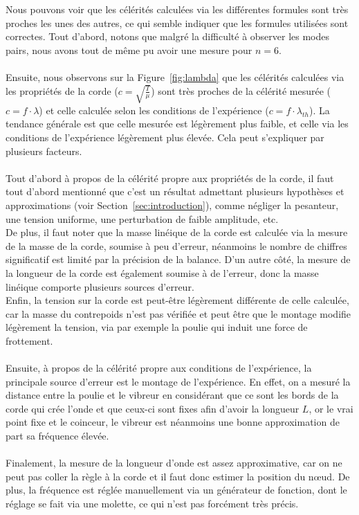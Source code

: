 \documentclass[11pt]{article}
\begin{document}
    Nous pouvons voir que les célérités calculées via les différentes formules sont très proches les unes des autres,
    ce qui semble indiquer que les formules utilisées sont correctes.
    Tout d'abord, notons que malgré la difficulté à observer les modes pairs, nous avons tout de même pu avoir une
    mesure pour $n=6$.\\ \\
    Ensuite, nous observons sur la Figure~\ref{fig:lambda} que les célérités calculées via les propriétés de la corde
    ($c = \sqrt{\frac{T}{\mu}}$) sont très proches de la célérité mesurée ($c=f \cdot \lambda $) et celle calculée
    selon les conditions de l'expérience ($c = f \cdot \lambda_{th} $).
    La tendance générale est que celle mesurée est légèrement plus faible, et celle via les conditions de l'expérience
    légèrement plus élevée.
    Cela peut s'expliquer par plusieurs facteurs.\\ \\
    Tout d'abord à propos de la célérité propre aux propriétés de la corde, il faut tout d'abord mentionné que
    c'est un résultat admettant plusieurs hypothèses et approximations (voir Section~\ref{sec:introduction}), comme
    négliger la pesanteur, une tension uniforme, une perturbation de faible amplitude, etc.\\
    De plus, il faut noter que la masse linéique de la corde est calculée via la mesure de la masse de la corde,
    soumise à peu d'erreur, néanmoins le nombre de chiffres significatif est limité par la précision de la balance.
    D'un autre côté, la mesure de la longueur de la corde est également soumise à de l'erreur, donc la masse linéique
    comporte plusieurs sources d'erreur.\\
    Enfin, la tension sur la corde est peut-être légèrement différente de celle calculée, car la masse du contrepoids
    n'est pas vérifiée et peut être que le montage modifie légèrement la tension, via par exemple la poulie qui
    induit une force de frottement.\\ \\
    Ensuite, à propos de la célérité propre aux conditions de l'expérience, la principale source d'erreur est le
    montage de l'expérience.
    En effet, on a mesuré la distance entre la poulie et le vibreur en considérant que ce sont les bords de la corde
    qui crée l'onde et que ceux-ci sont fixes afin d'avoir la longueur $L$, or le vrai point fixe et le coinceur,
    le vibreur est néanmoins une bonne approximation de part sa fréquence élevée.\\ \\
    Finalement, la mesure de la longueur d'onde est assez approximative, car on ne peut pas coller la règle à la corde
    et il faut donc estimer la position du nœud.
    De plus, la fréquence est réglée manuellement via un générateur de fonction, dont le réglage se fait via une
    molette, ce qui n'est pas forcément très précis.
\end{document}
